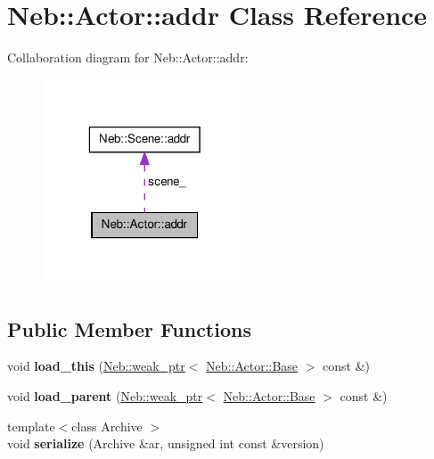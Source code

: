 \hypertarget{classNeb_1_1Actor_1_1addr}{\section{\-Neb\-:\-:\-Actor\-:\-:addr \-Class \-Reference}
\label{classNeb_1_1Actor_1_1addr}
}


\-Collaboration diagram for \-Neb\-:\-:\-Actor\-:\-:addr\-:\nopagebreak
\begin{figure}[H]
\begin{center}
\leavevmode
\includegraphics[width=172pt]{classNeb_1_1Actor_1_1addr__coll__graph}
\end{center}
\end{figure}
\subsection*{\-Public \-Member \-Functions}
\begin{DoxyCompactItemize}
\item 
\hypertarget{classNeb_1_1Actor_1_1addr_a3d896330ad2784859c5999037acaf217}{void {\bfseries load\-\_\-this} (\hyperlink{classNeb_1_1weak__ptr}{\-Neb\-::weak\-\_\-ptr}$<$ \hyperlink{classNeb_1_1Actor_1_1Base}{\-Neb\-::\-Actor\-::\-Base} $>$ const \&)}\label{classNeb_1_1Actor_1_1addr_a3d896330ad2784859c5999037acaf217}

\item 
\hypertarget{classNeb_1_1Actor_1_1addr_a7b708c2c6178ca420c71b582bc85897d}{void {\bfseries load\-\_\-parent} (\hyperlink{classNeb_1_1weak__ptr}{\-Neb\-::weak\-\_\-ptr}$<$ \hyperlink{classNeb_1_1Actor_1_1Base}{\-Neb\-::\-Actor\-::\-Base} $>$ const \&)}\label{classNeb_1_1Actor_1_1addr_a7b708c2c6178ca420c71b582bc85897d}

\item 
\hypertarget{classNeb_1_1Actor_1_1addr_aa98d825c934853c3e0cf7ed56c7f83d5}{{\footnotesize template$<$class Archive $>$ }\\void {\bfseries serialize} (\-Archive \&ar, unsigned int const \&version)}\label{classNeb_1_1Actor_1_1addr_aa98d825c934853c3e0cf7ed56c7f83d5}

\end{DoxyCompactItemize}
